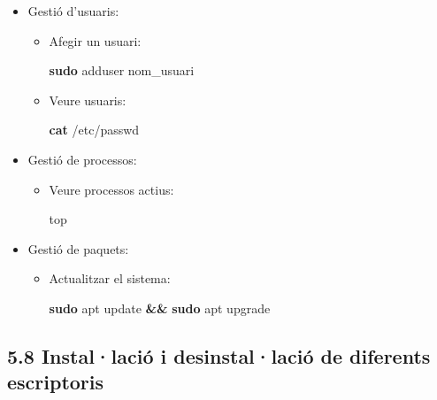 \documentclass[
  a4paper,
]{article}
\newenvironment{Shaded}{\begin{snugshade}}{\end{snugshade}}
\newcommand{\ExtensionTok}[1]{#1}
\newcommand{\FunctionTok}[1]{\textcolor[rgb]{0.13,0.29,0.53}{\textbf{#1}}}
\newcommand{\KeywordTok}[1]{\textcolor[rgb]{0.13,0.29,0.53}{\textbf{#1}}}
\newcommand{\NormalTok}[1]{#1}
\providecommand{\tightlist}{%
  \setlength{\itemsep}{0pt}\setlength{\parskip}{0pt}}
\begin{document}
\begin{itemize}
\tightlist
\item
  Gestió d'usuaris:

  \begin{itemize}
  \item
    Afegir un usuari:

\begin{Shaded}
\begin{Highlighting}[]
\FunctionTok{sudo}\NormalTok{ adduser nom\_usuari}
\end{Highlighting}
\end{Shaded}
  \item
    Veure usuaris:

\begin{Shaded}
\begin{Highlighting}[]
\FunctionTok{cat}\NormalTok{ /etc/passwd}
\end{Highlighting}
\end{Shaded}
  \end{itemize}
\item
  Gestió de processos:

  \begin{itemize}
  \item
    Veure processos actius:

\begin{Shaded}
\begin{Highlighting}[]
\ExtensionTok{top}
\end{Highlighting}
\end{Shaded}
  \end{itemize}
\item
  Gestió de paquets:

  \begin{itemize}
  \item
    Actualitzar el sistema:

\begin{Shaded}
\begin{Highlighting}[]
\FunctionTok{sudo}\NormalTok{ apt update }\KeywordTok{\&\&} \FunctionTok{sudo}\NormalTok{ apt upgrade}
\end{Highlighting}
\end{Shaded}
  \end{itemize}
\end{itemize}

\subsection{5.8 Instal·lació i desinstal·lació de diferents
escriptoris}\label{installaciuxf3-i-desinstallaciuxf3-de-diferents-escriptoris}
\end{document}
